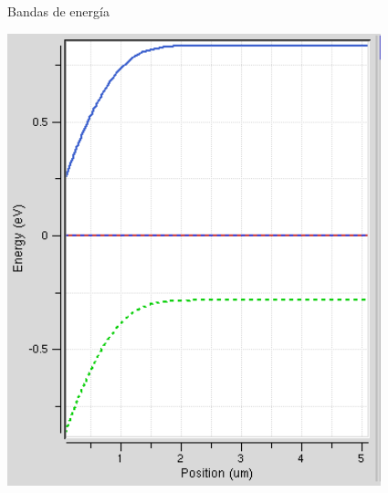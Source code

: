 \documentclass{/home/daniel/GitHub/USC-Physics-Degree-Notes/Notes/Presentacion}
\begin{document}
\begin{frame}{Bandas de energía}
\begin{minipage}{0.55\linewidth}
        \includegraphics[width=0.7\linewidth]{../Imagenes/0-Band.png}
    \end{minipage}
\end{frame}
\end{document}
